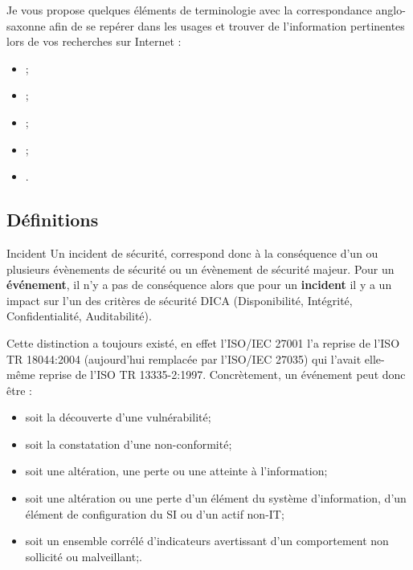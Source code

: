 Je vous propose quelques éléments de terminologie avec la correspondance anglo-saxonne afin de se repérer dans les usages et trouver de l'information pertinentes lors de vos recherches sur Internet :

\begin{itemize}
		\item {};
		\item{};
		\item {};
		\item {};
		\item {}.
\end{itemize}

\subsection{Définitions}

\begin{notebox}{Incident}
Un incident de sécurité, correspond donc à la conséquence d’un ou plusieurs évènements de sécurité ou un évènement de sécurité majeur. Pour un \textbf{événement}, il n'y a pas de conséquence alors que pour un \textbf{incident} il y a un impact sur l’un des critères de sécurité DICA (Disponibilité, Intégrité, Confidentialité, Auditabilité).
\end{notebox}

Cette distinction a toujours existé, en effet l'ISO/IEC 27001 l'a reprise de l'ISO TR 18044:2004 (aujourd'hui remplacée par l'ISO/IEC 27035) qui l'avait elle-même reprise de l'ISO TR 13335-2:1997. Concrètement, un événement peut donc être :

\begin{itemize}
  \item soit la découverte d’une vulnérabilité;
  \item  soit la constatation d’une non-conformité;
  \item soit une altération, une perte ou une atteinte à l’information;
  \item   soit une altération ou une perte d’un élément du système d’information, d’un élément de configuration du SI ou d’un actif non-IT;
  \item  soit un ensemble corrélé d'indicateurs avertissant d'un comportement non sollicité ou malveillant;.
\end{itemize}

